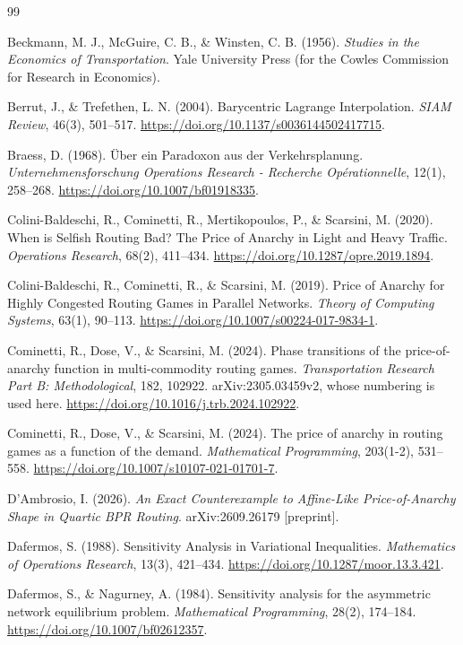 \begin{thebibliography}{99}

Beckmann, M. J., McGuire, C. B., \& Winsten, C. B. (1956). \emph{Studies in the Economics of Transportation}. Yale University Press (for the Cowles Commission for Research in Economics).

Berrut, J., \& Trefethen, L. N. (2004). Barycentric Lagrange Interpolation. \emph{SIAM Review}, 46(3), 501--517. \url{https://doi.org/10.1137/s0036144502417715}.

Braess, D. (1968). \"Uber ein Paradoxon aus der Verkehrsplanung. \emph{Unternehmensforschung Operations Research - Recherche Op{\'e}rationnelle}, 12(1), 258--268. \url{https://doi.org/10.1007/bf01918335}.

Colini-Baldeschi, R., Cominetti, R., Mertikopoulos, P., \& Scarsini, M. (2020). When is Selfish Routing Bad? The Price of Anarchy in Light and Heavy Traffic. \emph{Operations Research}, 68(2), 411--434. \url{https://doi.org/10.1287/opre.2019.1894}.

Colini-Baldeschi, R., Cominetti, R., \& Scarsini, M. (2019). Price of Anarchy for Highly Congested Routing Games in Parallel Networks. \emph{Theory of Computing Systems}, 63(1), 90--113. \url{https://doi.org/10.1007/s00224-017-9834-1}.

Cominetti, R., Dose, V., \& Scarsini, M. (2024). Phase transitions of the price-of-anarchy function in multi-commodity routing games. \emph{Transportation Research Part B: Methodological}, 182, 102922. arXiv:2305.03459v2, whose numbering is used here. \url{https://doi.org/10.1016/j.trb.2024.102922}.

Cominetti, R., Dose, V., \& Scarsini, M. (2024). The price of anarchy in routing games as a function of the demand. \emph{Mathematical Programming}, 203(1-2), 531--558. \url{https://doi.org/10.1007/s10107-021-01701-7}.

D'Ambrosio, I. (2026). \emph{An Exact Counterexample to Affine-Like Price-of-Anarchy Shape in Quartic BPR Routing}. arXiv:2609.26179 [preprint].

Dafermos, S. (1988). Sensitivity Analysis in Variational Inequalities. \emph{Mathematics of Operations Research}, 13(3), 421--434. \url{https://doi.org/10.1287/moor.13.3.421}.

Dafermos, S., \& Nagurney, A. (1984). Sensitivity analysis for the asymmetric network equilibrium problem. \emph{Mathematical Programming}, 28(2), 174--184. \url{https://doi.org/10.1007/bf02612357}.


\end{thebibliography}
